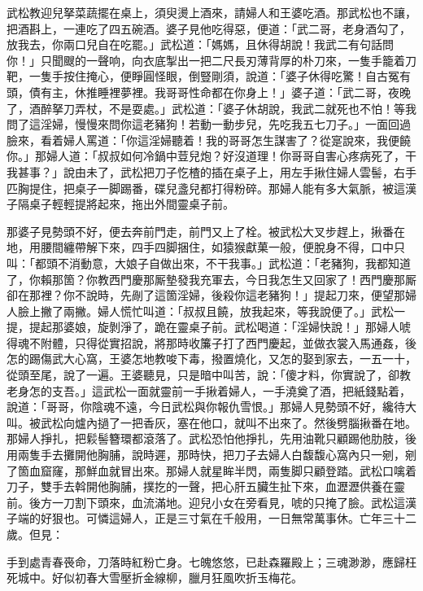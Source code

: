 武松教迎兒拏菜蔬擺在桌上，須臾燙上酒來，請婦人和王婆吃酒。那武松也不讓，把酒斟上，一連吃了四五碗酒。婆子見他吃得惡，便道：「武二哥，老身酒勾了，放我去，你兩口兒自在吃罷。」武松道：「媽媽，且休得胡說！我武二有句話問你！」只聞颼的一聲响，向衣底掣出一把二尺長刃薄背厚的朴刀來，一隻手籠着刀靶，一隻手按住掩心，便睜圓怪眼，倒豎剛須，說道：「婆子休得吃驚！自古冤有頭，債有主，休推睡裡夢裡。我哥哥性命都在你身上！」婆子道：「武二哥，夜晚了，酒醉拏刀弄杖，不是耍處。」武松道：「婆子休胡說，我武二就死也不怕！等我問了這淫婦，慢慢來問你這老豬狗！若動一動步兒，先吃我五七刀子。」一面回過臉來，看着婦人罵道：「你這淫婦聽着！我的哥哥怎生謀害了？從寔說來，我便饒你。」那婦人道：「叔叔如何冷鍋中荳兒炮？好沒道理！你哥哥自害心疼病死了，干我甚事？」說由未了，武松把刀子忔楂的插在桌子上，用左手揪住婦人雲髻，右手匹胸提住，把桌子一脚踢番，碟兒盞兒都打得粉碎。那婦人能有多大氣脈，被這漢子隔桌子輕輕提將起來，拖出外間靈桌子前。

那婆子見勢頭不好，便去奔前門走，前門又上了栓。被武松大叉步趕上，揪番在地，用腰間纏帶解下來，四手四脚捆住，如猿猴獻菓一般，便脫身不得，口中只叫：「都頭不消動意，大娘子自做出來，不干我事。」武松道：「老豬狗，我都知道了，你賴那箇？你教西門慶那厮墊發我充軍去，今日我怎生又回家了！西門慶那厮卻在那裡？你不說時，先剮了這箇淫婦，後殺你這老豬狗！」提起刀來，便望那婦人臉上撇了兩撇。婦人慌忙叫道：「叔叔且饒，放我起來，等我說便了。」武松一提，提起那婆娘，旋剝淨了，跪在靈桌子前。武松喝道：「淫婦快說！」那婦人唬得魂不附體，只得從實招說，將那時收簾子打了西門慶起，並做衣裳入馬通姦，後怎的踢傷武大心窩，王婆怎地教唆下毒，撥置燒化，又怎的娶到家去，一五一十，從頭至尾，說了一遍。{}王婆聽見，只是暗中叫苦，說：「傻才料，你實說了，卻教老身怎的支吾。」{}這武松一面就靈前一手揪着婦人，一手澆奠了酒，把紙錢點着，說道：「哥哥，你陰魂不遠，今日武松與你報仇雪恨。」那婦人見勢頭不好，纔待大叫。被武松向爐內撾了一把香灰，塞在他口，就叫不出來了。然後劈腦揪番在地。那婦人掙扎，把鬏髻簪環都滾落了。{}武松恐怕他掙扎，先用油靴只顧踢他肋肢，後用兩隻手去攤開他胸脯，說時遲，那時快，把刀子去婦人白馥馥心窩內只一剜，剜了箇血窟窿，那鮮血就冒出來。那婦人就星眸半閃，兩隻脚只顧登踏。武松口噙着刀子，雙手去斡開他胸脯，撲扢的一聲，把心肝五臟生扯下來，血瀝瀝供養在靈前。後方一刀割下頭來，血流滿地。{}迎兒小女在旁看見，唬的只掩了臉。武松這漢子端的好狠也。可憐這婦人，正是三寸氣在千般用，一日無常萬事休。亡年三十二歲。但見：

\begin{myquote}
手到處青春䘮命，刀落時紅粉亡身。七魄悠悠，已赴森羅殿上；三魂渺渺，應歸枉死城中。好似初春大雪壓折金線柳，臘月狂風吹折玉梅花。
\end{myquote}

